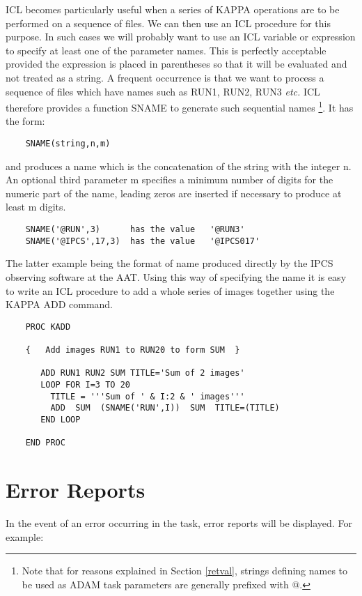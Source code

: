 ICL becomes particularly useful when a series of KAPPA operations are to
be performed on a sequence of files. We can then use an ICL procedure for
this purpose. In such cases we will probably want to use an ICL variable
or expression to specify at least one of the parameter names. This is
perfectly acceptable provided the expression is placed in parentheses so
that it will be evaluated and not treated as a string. A frequent occurrence
is that we want to process a sequence of files which have names such as
RUN1, RUN2, RUN3 {\em etc.} ICL therefore provides a function SNAME to generate
such sequential names
\footnote{Note that for reasons explained in Section \ref{retval}, strings
defining names to be used as ADAM task parameters are generally prefixed with
@.}.
It has the form:
\begin{verbatim}
    SNAME(string,n,m)
\end{verbatim}

and produces a name which is the concatenation of the string with the integer
n. An optional third parameter m specifies a minimum number of digits for
the numeric part of the name, leading zeros are inserted if necessary to
produce at least m digits.
\begin{verbatim}
    SNAME('@RUN',3)      has the value   '@RUN3'                        
    SNAME('@IPCS',17,3)  has the value   '@IPCS017'
\end{verbatim}
The latter example being the format of name produced directly by the IPCS
observing software at the AAT. Using this way of specifying the name it
is easy to write an ICL procedure to add a whole series of images together
using the KAPPA ADD command.

\begin{verbatim}
    PROC KADD
       
    {   Add images RUN1 to RUN20 to form SUM  }

       ADD RUN1 RUN2 SUM TITLE='Sum of 2 images'
       LOOP FOR I=3 TO 20
         TITLE = '''Sum of ' & I:2 & ' images'''
         ADD  SUM  (SNAME('RUN',I))  SUM  TITLE=(TITLE)
       END LOOP

    END PROC
\end{verbatim}

\section{Error Reports}
In the event of an error occurring in the task, error reports will be
displayed. For example:

